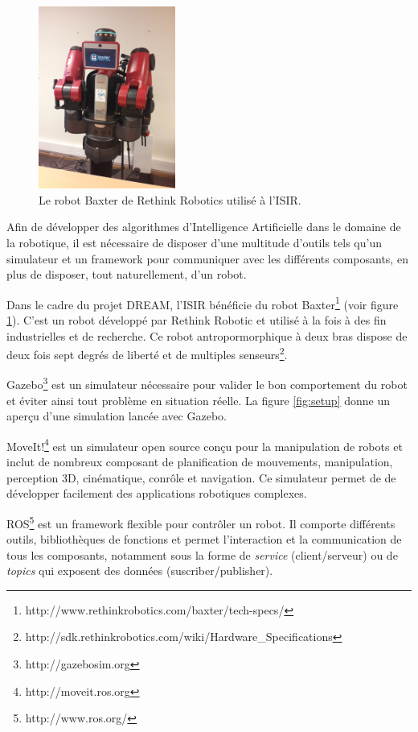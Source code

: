 \documentclass{llncs}
\begin{document}
\begin{figure}
  \begin{center}
    \includegraphics[angle=-90, width=0.4\textwidth]{figures/baxter}
  \end{center}
  \caption{Le robot Baxter de Rethink Robotics utilisé à l'ISIR.}
  \label{fig:baxter}
\end{figure}

Afin de développer des algorithmes d'Intelligence Artificielle dans le domaine de la robotique, il est nécessaire de disposer d'une multitude d'outils tels qu'un simulateur et un framework pour communiquer avec les différents composants, en plus de disposer, tout naturellement, d'un robot.

Dans le cadre du projet DREAM, l'ISIR bénéficie du robot Baxter\footnote{http://www.rethinkrobotics.com/baxter/tech-specs/} (voir figure \ref{fig:baxter}). C'est un robot développé par Rethink Robotic et utilisé à la fois à des fin industrielles et de recherche. Ce robot antropormorphique à deux bras dispose de deux fois sept degrés de liberté et de multiples senseurs\footnote{http://sdk.rethinkrobotics.com/wiki/Hardware\_Specifications}.

Gazebo\footnote{http://gazebosim.org} est un simulateur nécessaire pour valider le bon comportement du robot et éviter ainsi tout problème en situation réelle. La figure \ref{fig:setup} donne un aperçu d'une simulation lancée avec Gazebo.

MoveIt!\footnote{http://moveit.ros.org} est un simulateur open source conçu pour la manipulation de robots et inclut de nombreux composant de planification de mouvements, manipulation, perception 3D, cinématique, conrôle et navigation. Ce simulateur permet de de développer facilement des applications robotiques complexes.

ROS\footnote{http://www.ros.org/} est un framework flexible pour contrôler un robot. Il comporte différents outils, bibliothèques de fonctions et permet l'interaction et la communication de tous les composants, notamment sous la forme de \textit{service} (client/serveur) ou de \textit{topics} qui exposent des données (suscriber/publisher).
\end{document}
